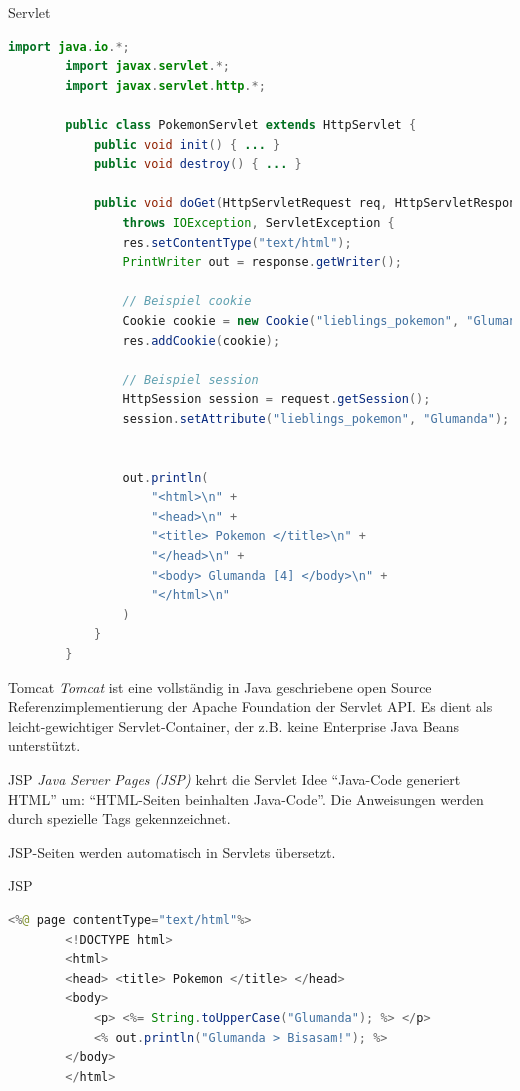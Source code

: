 \begin{example}{Servlet}
    \begin{lstlisting}[language=Java]
        import java.io.*;
        import javax.servlet.*;
        import javax.servlet.http.*;

        public class PokemonServlet extends HttpServlet {
            public void init() { ... }
            public void destroy() { ... }

            public void doGet(HttpServletRequest req, HttpServletResponse res)
                throws IOException, ServletException {
                res.setContentType("text/html");
                PrintWriter out = response.getWriter();

                // Beispiel cookie
                Cookie cookie = new Cookie("lieblings_pokemon", "Glumanda");
                res.addCookie(cookie);

                // Beispiel session
                HttpSession session = request.getSession();
                session.setAttribute("lieblings_pokemon", "Glumanda");

                
                out.println(
                    "<html>\n" +
                    "<head>\n" +
                    "<title> Pokemon </title>\n" +
                    "</head>\n" +
                    "<body> Glumanda [4] </body>\n" +
                    "</html>\n"
                )
            }
        }
    \end{lstlisting}
\end{example}

\begin{defi}{Tomcat}
    \emph{Tomcat} ist eine vollständig in Java geschriebene open Source Referenzimplementierung der Apache Foundation der Servlet API.
    Es dient als leicht-gewichtiger Servlet-Container, der z.B. keine Enterprise Java Beans unterstützt.
\end{defi}

\begin{defi}{JSP}
    \emph{Java Server Pages (JSP)} kehrt die Servlet Idee \enquote{Java-Code generiert HTML} um: \enquote{HTML-Seiten beinhalten Java-Code}.
    Die Anweisungen werden durch spezielle Tags gekennzeichnet.

    JSP-Seiten werden automatisch in Servlets übersetzt.
\end{defi}

\begin{example}{JSP}
    \begin{lstlisting}[language=Java]
        <%@ page contentType="text/html"%>
        <!DOCTYPE html>
        <html>
        <head> <title> Pokemon </title> </head>
        <body>
            <p> <%= String.toUpperCase("Glumanda"); %> </p>
            <% out.println("Glumanda > Bisasam!"); %>
        </body>
        </html>
    \end{lstlisting}
\end{example}

